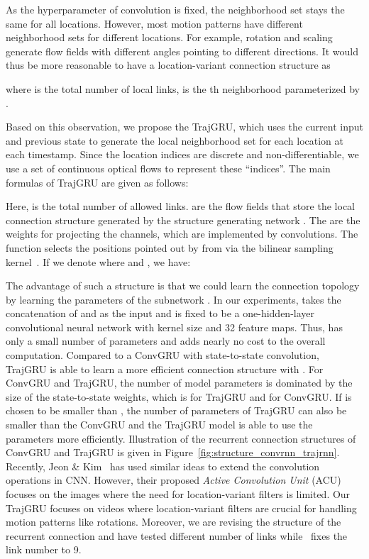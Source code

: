 \documentclass{article}
\begin{document}
As the hyperparameter of convolution is fixed, the neighborhood set  stays the same for all locations. However, most motion patterns have different neighborhood sets for different locations. For example, rotation and scaling generate flow fields with different angles pointing to different directions. It would thus be more reasonable to have a location-variant connection structure as

where  is the total number of local links,  is the th neighborhood parameterized by .

Based on this observation, we propose the TrajGRU, which uses the current input and previous state to generate the local neighborhood set for each location at each timestamp. Since the location indices are discrete and non-differentiable, we use a set of continuous optical flows to represent these ``indices''. The main formulas of TrajGRU are given as follows:

Here,  is the total number of allowed links.  are the flow fields that store the local connection structure generated by the structure generating network . The  are the weights for projecting the channels, which are implemented by  convolutions. The  function selects the positions pointed out by  from  via the bilinear sampling kernel~\cite{jaderberg2015spatial,ilg2017flownet}. If we denote  where  and , we have:

The advantage of such a structure is that we could learn the connection topology by learning the parameters of the subnetwork . In our experiments,  takes the concatenation of  and  as the input and is fixed to be a one-hidden-layer convolutional neural network with  kernel size and 32 feature maps. Thus,  has only a small number of parameters and adds nearly no cost to the overall computation. Compared to a ConvGRU with  state-to-state convolution, TrajGRU is able to learn a more efficient connection structure with . For ConvGRU and TrajGRU, the number of model parameters is dominated by the size of the state-to-state weights, which is  for TrajGRU and  for ConvGRU. If  is chosen to be smaller than , the number of parameters of TrajGRU can also be smaller than the ConvGRU and the TrajGRU model is able to use the parameters more efficiently. Illustration of the recurrent connection structures of ConvGRU and TrajGRU is given in Figure~\ref{fig:structure_convrnn_trajrnn}. Recently, Jeon \& Kim~\cite{jeon2017active}
has used similar ideas to extend the convolution operations in CNN. However, their proposed \emph{Active Convolution Unit} (ACU) focuses on the images where the need for location-variant filters is limited. Our TrajGRU focuses on videos where location-variant filters are crucial for handling motion patterns like rotations. Moreover, we are revising the structure of the recurrent connection and have tested different number of links while~\cite{jeon2017active} fixes the link number to 9.
\end{document}
